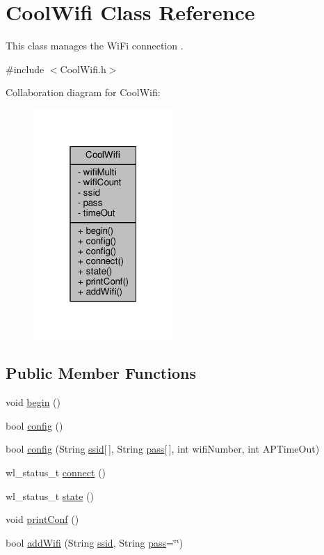 \hypertarget{classCoolWifi}{}\section{Cool\+Wifi Class Reference}
\label{classCoolWifi}


This class manages the Wi\+Fi connection .  




{\ttfamily \#include $<$Cool\+Wifi.\+h$>$}



Collaboration diagram for Cool\+Wifi\+:
\nopagebreak
\begin{figure}[H]
\begin{center}
\leavevmode
\includegraphics[width=151pt]{classCoolWifi__coll__graph}
\end{center}
\end{figure}
\subsection*{Public Member Functions}
\begin{DoxyCompactItemize}
\item 
void \hyperlink{classCoolWifi_a46942fed90e475112cc10b78a32e7aaa}{begin} ()
\item 
bool \hyperlink{classCoolWifi_a4eb2f6b9b09dd588964b88b6c70122c0}{config} ()
\item 
bool \hyperlink{classCoolWifi_a871d4a0d9978f17fdf6d874fc2958b6c}{config} (String \hyperlink{classCoolWifi_a893b21d0fed821438733bba2e73fb4c2}{ssid}\mbox{[}$\,$\mbox{]}, String \hyperlink{classCoolWifi_a0c3332a149245aaad060b32593a54c9b}{pass}\mbox{[}$\,$\mbox{]}, int wifi\+Number, int A\+P\+Time\+Out)
\item 
wl\+\_\+status\+\_\+t \hyperlink{classCoolWifi_ad060353050f40d032a2dbf9e54a768bf}{connect} ()
\item 
wl\+\_\+status\+\_\+t \hyperlink{classCoolWifi_a1c7b4d82a4098d346e7593dce92039fa}{state} ()
\item 
void \hyperlink{classCoolWifi_a9e6105c6d13d35ec510f6633da9e0223}{print\+Conf} ()
\item 
bool \hyperlink{classCoolWifi_a914d7a1df14dd6b75345fb614c34e9d6}{add\+Wifi} (String \hyperlink{classCoolWifi_a893b21d0fed821438733bba2e73fb4c2}{ssid}, String \hyperlink{classCoolWifi_a0c3332a149245aaad060b32593a54c9b}{pass}=\char`\"{}\char`\"{})
\end{DoxyCompactItemize}

